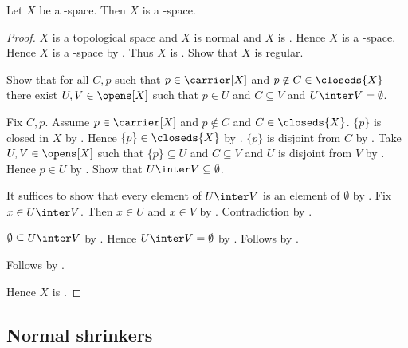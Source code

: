 \begin{theorem}\label{teefour_space_is_teethree_space}
    Let $X$ be a \teefour-space.
    Then $X$ is a \teethree-space.
\end{theorem}
\begin{proof}
    $X$ is a topological space and $X$ is normal and $X$ is \teeone.
    Hence $X$ is a \teeone-space.
    Hence $X$ is a \teezero-space
        by .
    Thus $X$ is \teezero.
    Show that $X$ is regular.
    \begin{subproof}
        Show that for all $C,p$ such that
            $p\in\carrier[X]$ and $p\notin C\in\closeds{X}$
            there exist $U,V\in\opens[X]$ such that
            $p\in U$ and $C\subseteq V$ and $U\inter V=\emptyset$.
        \begin{subproof}
            Fix $C,p$.
            Assume $p\in\carrier[X]$ and $p\notin C$ and
                $C\in\closeds{X}$.
            $\{p\}$ is closed in $X$
                by .
            Hence $\{p\}\in\closeds{X}$ by .
            $\{p\}$ is disjoint from $C$
                by .
            Take $U,V\in\opens[X]$ such that
                $\{p\}\subseteq U$ and $C\subseteq V$ and
                $U$ is disjoint from $V$ by .
            Hence $p\in U$ by .
            Show that $U\inter V\subseteq\emptyset$.
            \begin{subproof}
                It suffices to show that every element of $U\inter V$
                    is an element of $\emptyset$ by .
                Fix $x\in U\inter V$.
                Then $x\in U$ and $x\in V$ by .
                Contradiction by .
            \end{subproof}
            $\emptyset\subseteq U\inter V$ by .
            Hence $U\inter V=\emptyset$
                by .
            Follows by \auto.
        \end{subproof}
        Follows by .
    \end{subproof}
    Hence $X$ is \teethree.
\end{proof}

\subsection{Normal shrinkers}

